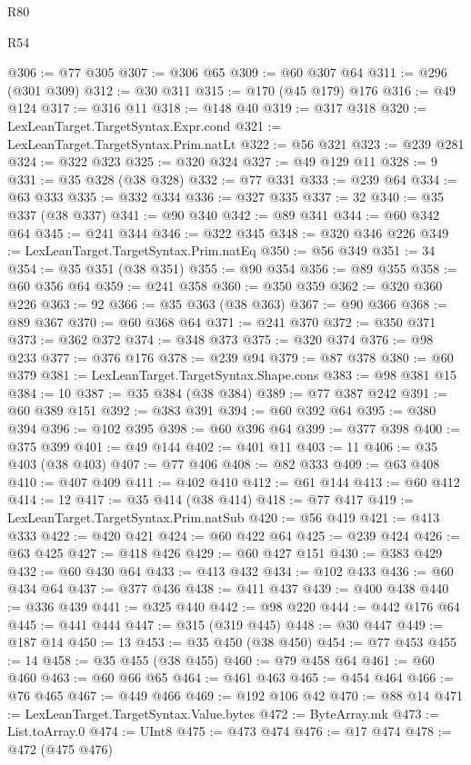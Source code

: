 \begin{lexlean}{R80}
\begin{lexlean}{R54}
\begin{coremodule}
{{{{{{{{{{{{{{{{{{{{{{{{{{{{{{{{{{{{{{{{{{{{{{{{{{@306 := @77 @305
@307 := @306 @65
@309 := @60 @307 @64
@311 := @296 (@301 @309)
@312 := @30 @311
@315 := @170 (@45 @179) @176
@316 := @49 @124
@317 := @316 @11
@318 := @148 @40
@319 := @317 @318
@320 := LexLeanTarget.TargetSyntax.Expr.cond
@321 := LexLeanTarget.TargetSyntax.Prim.natLt
@322 := @56 @321
@323 := @239 @281
@324 := @322 @323
@325 := @320 @324
@327 := @49 @129 @11
@328 := 9
@331 := @35 @328 (@38 @328)
@332 := @77 @331
@333 := @239 @64
@334 := @63 @333
@335 := @332 @334
@336 := @327 @335
@337 := 32
@340 := @35 @337 (@38 @337)
@341 := @90 @340
@342 := @89 @341
@344 := @60 @342 @64
@345 := @241 @344
@346 := @322 @345
@348 := @320 @346 @226
@349 := LexLeanTarget.TargetSyntax.Prim.natEq
@350 := @56 @349
@351 := 34
@354 := @35 @351 (@38 @351)
@355 := @90 @354
@356 := @89 @355
@358 := @60 @356 @64
@359 := @241 @358
@360 := @350 @359
@362 := @320 @360 @226
@363 := 92
@366 := @35 @363 (@38 @363)
@367 := @90 @366
@368 := @89 @367
@370 := @60 @368 @64
@371 := @241 @370
@372 := @350 @371
@373 := @362 @372
@374 := @348 @373
@375 := @320 @374
@376 := @98 @233
@377 := @376 @176
@378 := @239 @94
@379 := @87 @378
@380 := @60 @379
@381 := LexLeanTarget.TargetSyntax.Shape.cons
@383 := @98 @381 @15
@384 := 10
@387 := @35 @384 (@38 @384)
@389 := @77 @387 @242
@391 := @60 @389 @151
@392 := @383 @391
@394 := @60 @392 @64
@395 := @380 @394
@396 := @102 @395
@398 := @60 @396 @64
@399 := @377 @398
@400 := @375 @399
@401 := @49 @144
@402 := @401 @11
@403 := 11
@406 := @35 @403 (@38 @403)
@407 := @77 @406
@408 := @82 @333
@409 := @63 @408
@410 := @407 @409
@411 := @402 @410
@412 := @61 @144
@413 := @60 @412
@414 := 12
@417 := @35 @414 (@38 @414)
@418 := @77 @417
@419 := LexLeanTarget.TargetSyntax.Prim.natSub
@420 := @56 @419
@421 := @413 @333
@422 := @420 @421
@424 := @60 @422 @64
@425 := @239 @424
@426 := @63 @425
@427 := @418 @426
@429 := @60 @427 @151
@430 := @383 @429
@432 := @60 @430 @64
@433 := @413 @432
@434 := @102 @433
@436 := @60 @434 @64
@437 := @377 @436
@438 := @411 @437
@439 := @400 @438
@440 := @336 @439
@441 := @325 @440
@442 := @98 @220
@444 := @442 @176 @64
@445 := @441 @444
@447 := @315 (@319 @445)
@448 := @30 @447
@449 := @187 @14
@450 := 13
@453 := @35 @450 (@38 @450)
@454 := @77 @453
@455 := 14
@458 := @35 @455 (@38 @455)
@460 := @79 @458 @64
@461 := @60 @460
@463 := @60 @66 @65
@464 := @461 @463
@465 := @454 @464
@466 := @76 @465
@467 := @449 @466
@469 := @192 @106 @42
@470 := @88 @14
@471 := LexLeanTarget.TargetSyntax.Value.bytes
@472 := ByteArray.mk
@473 := List.toArray.{0}
@474 := UInt8
@475 := @473 @474
@476 := @17 @474
@478 := @472 (@475 @476)
}}}}}}}}}}}}}}}}}}}}}}}}}}}}}}}}}}}}}}}}}}}}}}}}}}
\end{coremodule}
\end{lexlean}
\end{lexlean}

